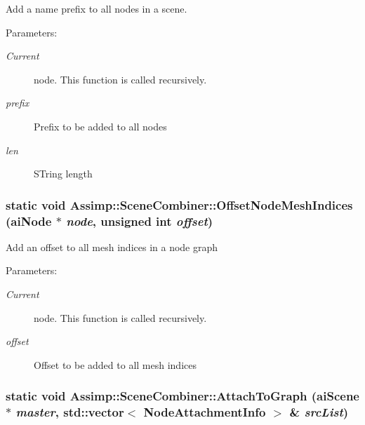 Add a name prefix to all nodes in a scene.

\begin{Desc}
\item[Parameters:]
\begin{description}
\item[{\em Current}]node. This function is called recursively. \item[{\em prefix}]Prefix to be added to all nodes \item[{\em len}]STring length \end{description}
\end{Desc}
\hypertarget{class_assimp_1_1_scene_combiner_0c52e873dfdd0c71f7f2bae06bcbb865}{
\subsubsection[OffsetNodeMeshIndices]{\setlength{\rightskip}{0pt plus 5cm}static void Assimp::SceneCombiner::OffsetNodeMeshIndices ({\bf aiNode} $\ast$ {\em node}, \/  unsigned int {\em offset})}}
\label{class_assimp_1_1_scene_combiner_0c52e873dfdd0c71f7f2bae06bcbb865}


Add an offset to all mesh indices in a node graph

\begin{Desc}
\item[Parameters:]
\begin{description}
\item[{\em Current}]node. This function is called recursively. \item[{\em offset}]Offset to be added to all mesh indices \end{description}
\end{Desc}
\hypertarget{class_assimp_1_1_scene_combiner_1672dc80009a8183edbabc4ef262b5c5}{
\subsubsection[AttachToGraph]{\setlength{\rightskip}{0pt plus 5cm}static void Assimp::SceneCombiner::AttachToGraph ({\bf aiScene} $\ast$ {\em master}, \/  std::vector$<$ NodeAttachmentInfo $>$ \& {\em srcList})}}
\label{class_assimp_1_1_scene_combiner_1672dc80009a8183edbabc4ef262b5c5}


